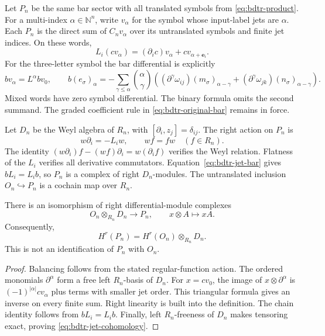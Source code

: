 Let $P_n$ be the same bar sector with all translated symbols from \eqref{eq:bdtr-product}.
For a multi-index $\alpha\in\mathbb N^n$, write $v_\alpha$ for the symbol whose input-label jets are $\alpha$.
Each $P_n$ is the direct sum of $C_n v_\alpha$ over its untranslated symbols and finite jet indices.
On these words,
\[
 L_i(cv_\alpha)=(\partial_ic)v_\alpha+cv_{\alpha+\mathbf e_i}.
\]
For the three-letter symbol the bar differential is explicitly
\begin{equation}\label{eq:bdtr-jet-bar}
 bv_\alpha=L^\alpha bv_0,
 \qquad
 b(e_\sigma)_\alpha
 =-\sum_{\gamma\leq\alpha}\binom\alpha\gamma
 \left((\partial^\gamma\omega_{ij})(m_\sigma)_{\alpha-\gamma}
       +(\partial^\gamma\omega_{jk})(n_\sigma)_{\alpha-\gamma}\right).
\end{equation}
Mixed words have zero symbol differential.
The binary formula omits the second summand.
The graded coefficient rule in \eqref{eq:bdtr-original-bar} remains in force.

Let $D_n$ be the Weyl algebra of $R_n$, with $[\partial_i,z_j]=\delta_{ij}$.
The right action on $P_n$ is
\begin{equation}\label{eq:bdtr-right-action}
 w\partial_i=-L_iw,
 \qquad wf=fw\quad(f\in R_n).
\end{equation}
The identity $(w\partial_i)f-(wf)\partial_i=w(\partial_if)$ verifies the Weyl relation.
Flatness of the $L_i$ verifies all derivative commutators.
Equation~\eqref{eq:bdtr-jet-bar} gives $bL_i=L_ib$, so $P_n$ is a complex of right $D_n$-modules.
The untranslated inclusion $O_n\hookrightarrow P_n$ is a cochain map over $R_n$.

\begin{proposition}\label{prop:bdtr-induced-identification}
There is an isomorphism of right differential-module complexes
\begin{equation}\label{eq:bdtr-induced}
 O_n\otimes_{R_n}D_n\longrightarrow P_n,
 \qquad x\otimes A\longmapsto xA.
\end{equation}
Consequently,
\begin{equation}\label{eq:bdtr-jet-cohomology}
 H^r(P_n)=H^r(O_n)\otimes_{R_n}D_n.
\end{equation}
This is not an identification of $P_n$ with $O_n$.
\end{proposition}
\begin{proof}
Balancing follows from the stated regular-function action.
The ordered monomials $\partial^\alpha$ form a free left $R_n$-basis of $D_n$.
For $x=cv_0$, the image of $x\otimes\partial^\alpha$ is
$(-1)^{|\alpha|}cv_\alpha$ plus terms with smaller jet order.
This triangular formula gives an inverse on every finite sum.
Right linearity is built into the definition.
The chain identity follows from $bL_i=L_ib$.
Finally, left $R_n$-freeness of $D_n$ makes tensoring exact, proving \eqref{eq:bdtr-jet-cohomology}.
\end{proof}

